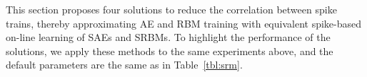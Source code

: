  
This section proposes four solutions to reduce the correlation between spike trains, thereby approximating AE and RBM training with equivalent spike-based on-line learning of SAEs and SRBMs.
To highlight the performance of the solutions, we apply these methods to the same experiments above, and the default parameters are the same as in Table~\ref{tbl:srm}.
\begin{figure}
	\centering
	\begin{subfigure}[c]{0.48\textwidth}\raggedleft
		\\
		\\

\end{subfigure}
\end{figure}

